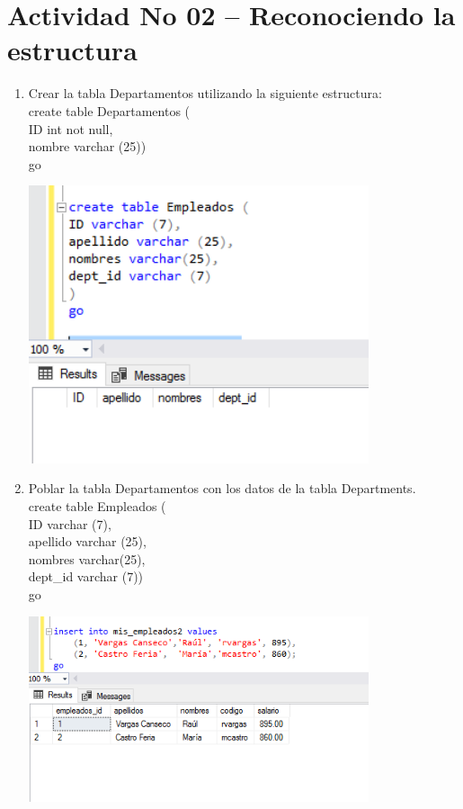 \section{Actividad No 02 – Reconociendo la estructura} 

\begin{enumerate}[1.]
	\item Crear la tabla Departamentos utilizando la siguiente estructura:
           \\create table Departamentos (
		\\ID int not null,
		\\nombre varchar (25))
		\\go
	\begin{center}
	\includegraphics[width=10cm]{./Imagenes/prac2eje1} 
	\end{center}
	\item Poblar la tabla Departamentos con los datos de la tabla Departments.
		\\create table Empleados (
		\\ID varchar (7),
		\\apellido varchar (25),
		\\nombres varchar(25),
		\\dept\_id varchar (7))
		\\go
	\begin{center}
	\includegraphics[width=10cm]{./Imagenes/prac2eje2} 

\end{center}
\end{enumerate}

